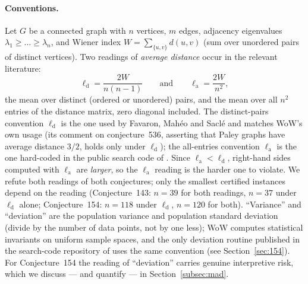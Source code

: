 \documentclass[11pt]{article}
\theoremstyle{remark}
\newcommand{\la}{\ell_{\mathrm{a}}}
\newcommand{\ld}{\ell_{\mathrm{d}}}
\begin{document}
\paragraph{Conventions.}
Let $G$ be a connected graph with $n$ vertices, $m$ edges, adjacency
eigenvalues $\lambda_1 \ge \dots \ge \lambda_n$, and Wiener index
$W = \sum_{\{u,v\}} d(u,v)$ (sum over unordered pairs of distinct vertices).
Two readings of \emph{average distance} occur in the relevant literature:
\[
\ld = \frac{2W}{n(n-1)}
\qquad\text{and}\qquad
\la = \frac{2W}{n^2},
\]
the mean over distinct (ordered or unordered) pairs, and the mean over all
$n^2$ entries of the distance matrix, zero diagonal included. The
distinct-pairs convention $\ld$ is the one used by Favaron, Mah\'eo and
Sacl\'e \cite{FMS1993} and matches WoW's own usage (its comment on
conjecture~536, asserting that Paley graphs have average distance $3/2$,
holds only under $\ld$); the all-entries convention $\la$ is the one
hard-coded in the public search code of \cite{RoucairolCazenave2025}. Since
$\la < \ld$, right-hand sides computed with $\la$ are \emph{larger}, so the
$\la$ reading is the harder one to violate. We refute both readings of both
conjectures; only the smallest certified instances depend on the reading
(Conjecture~143: $n=39$ for both readings, $n=37$ under $\ld$ alone;
Conjecture~154: $n=118$ under $\ld$, $n=120$ for both).
``Variance'' and ``deviation'' are the population variance and population
standard deviation (divide by the number of data points, not by one less);
WoW computes statistical invariants on uniform sample spaces, and the only
deviation routine published in the search-code repository of
\cite{RoucairolCazenave2025} uses the same convention (see
Section~\ref{sec:154}). For
Conjecture~154 the reading of ``deviation'' carries genuine interpretive
risk, which we discuss --- and quantify --- in Section~\ref{subsec:mad}.
\end{document}
